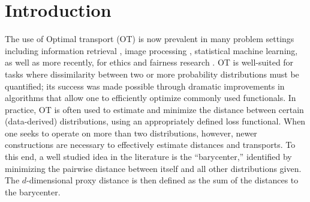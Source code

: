 \section{Introduction}
The use of Optimal transport (OT) is now prevalent in many problem settings including information retrieval \citep{balikas2018cross,yurochkin2019hierarchical}, image processing \citep{otip}, statistical machine learning, as well as more recently, for ethics and fairness research \citep{kwegyiraggrey2021relative}. 
OT is well-suited for tasks where dissimilarity between two or more probability distributions must be quantified; 
its success was made possible through dramatic improvements in algorithms \citep{cuturi2013sinkhorn,solomon2015convolutional} that allow one to efficiently optimize commonly used functionals.
In practice, OT is often used to estimate and minimize the 
distance between certain (data-derived) distributions, 
using an appropriately defined loss functional. %
When one seeks to operate on more than two distributions, however, newer constructions are necessary to effectively estimate distances and transports.
To this end, a well studied idea in the literature is the ``barycenter,''
identified by minimizing the pairwise distance between itself and all other distributions given. 
The $d$-dimensional proxy distance is then defined as the sum of the distances to the barycenter.



